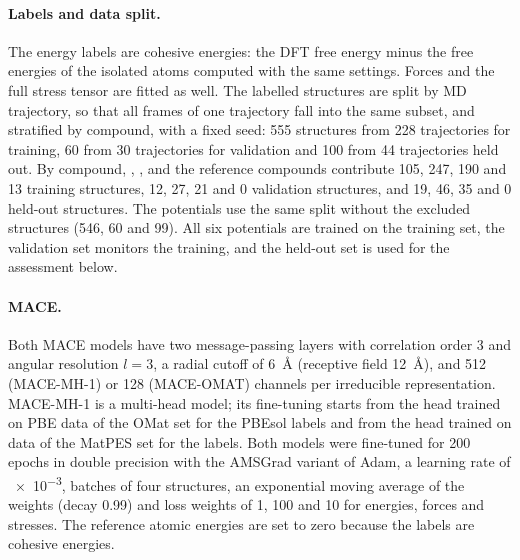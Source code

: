 \paragraph{Labels and data split.}
The energy labels are cohesive energies: the DFT free energy minus the free energies of the
isolated atoms computed with the same settings. Forces and the full stress tensor are fitted as
well. The labelled structures are split by MD trajectory, so that all frames of one trajectory
fall into the same subset, and stratified by compound, with a fixed seed: 555 structures from 228
trajectories for training, 60 from 30 trajectories for validation and 100 from 44 trajectories
held out. By compound, \CsSnI{}, \MASnI{}, \FASnI{} and the reference compounds contribute 105,
247, 190 and 13 training structures, 12, 27, 21 and 0 validation structures, and 19, 46, 35 and 0
held-out structures. The \rSCAN{} potentials use the same split without the excluded structures
(546, 60 and 99). All six potentials are trained on the training set, the validation set monitors
the training, and the held-out set is used for the assessment below.

\paragraph{MACE.}
Both MACE models have two message-passing layers with correlation order 3 and angular resolution
$l = 3$, a radial cutoff of \SI{6}{\angstrom} (receptive field \SI{12}{\angstrom}), and 512
(MACE-MH-1) or 128 (MACE-OMAT) channels per irreducible representation. MACE-MH-1 is a
multi-head model; its fine-tuning starts from the head trained on PBE data of the OMat set for the
PBEsol labels and from the head trained on \rSCAN{} data of the MatPES set for the \rSCAN{}
labels. Both models were fine-tuned for 200 epochs in double precision with the AMSGrad variant of
Adam, a learning rate of \num{e-3}, batches of four structures, an exponential moving average of
the weights (decay 0.99) and loss weights of 1, 100 and 10 for energies, forces and stresses. The
reference atomic energies are set to zero because the labels are cohesive energies.

